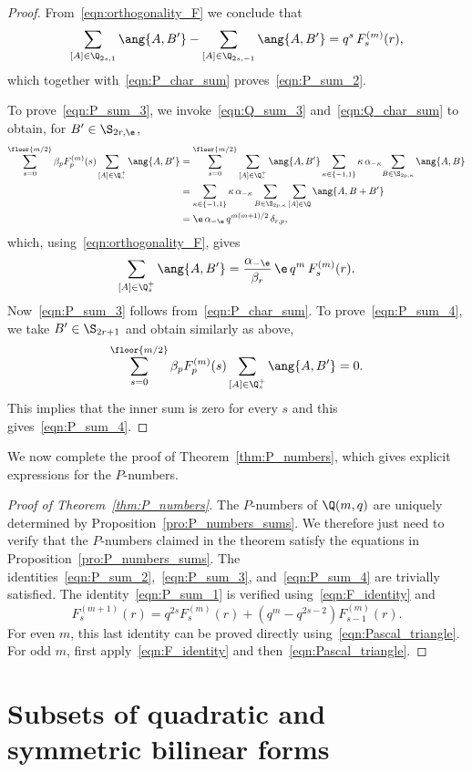 \begin{proof}
From~\eqref{eqn:orthogonality_F} we conclude that
\[
\sum_{[A]\in\Q_{2s,1}}\ang{A,B'}-\sum_{[A]\in\Q_{2s,-1}}\ang{A,B'}=q^s\,F^{(m)}_s(r),
\]
which together with~\eqref{eqn:P_char_sum} proves~\eqref{eqn:P_sum_2}.
\par
To prove~\eqref{eqn:P_sum_3}, we invoke~\eqref{eqn:Q_sum_3} and~\eqref{eqn:Q_char_sum} to obtain, for $B'\in\S_{2r,\e}$,
\begin{align*}
\sum_{s=0}^{\floor{m/2}}\beta_pF^{(m)}_p(s)\sum_{[A]\in\Q_s^+}\ang{A,B'}&=\sum_{s=0}^{\floor{m/2}}\sum_{[A]\in\Q_s^+}\ang{A,B'}\sum_{\kappa\in\{-1,1\}}\kappa\,\alpha_{-\kappa}\!\sum_{B\in\S_{2p,\kappa}}\ang{A,B}\\%
&=\sum_{\kappa\in\{-1,1\}}\kappa\,\alpha_{-\kappa}\sum_{B\in\S_{2p,\kappa}}\sum_{[A]\in\Q}\ang{A,B+B'}\\%
&=\e\,\alpha_{-\e}\,q^{m(m+1)/2}\,\delta_{r,p},
\end{align*}
which, using~\eqref{eqn:orthogonality_F}, gives
\[
\sum_{[A]\in\Q_s^+}\ang{A,B'}=\frac{\alpha_{-\e}}{\beta_r}\,\e\,q^m\,F^{(m)}_s(r).
\]
Now~\eqref{eqn:P_sum_3} follows from~\eqref{eqn:P_char_sum}. 
To prove~\eqref{eqn:P_sum_4}, we take $B'\in\S_{2r+1}$ and obtain similarly as above,
\[
\sum_{s=0}^{\floor{m/2}}\beta_pF^{(m)}_p(s)\sum_{[A]\in\Q_s^+}\ang{A,B'}=0.
\]
This implies that the inner sum is zero for every $s$ and this gives~\eqref{eqn:P_sum_4}.
\end{proof}
\par
We now complete the proof of Theorem~\ref{thm:P_numbers}, which gives explicit expressions for the $P$-numbers.
\begin{proof}[Proof of Theorem~\ref{thm:P_numbers}]
The $P$-numbers of $\Q(m,q)$ are uniquely determined by Proposition~\ref{pro:P_numbers_sums}. We therefore just need to verify that the $P$-numbers claimed in the theorem satisfy the equations in Proposition~\ref{pro:P_numbers_sums}. The identities~\eqref{eqn:P_sum_2},~\eqref{eqn:P_sum_3}, and~\eqref{eqn:P_sum_4} are trivially satisfied. The identity~\eqref{eqn:P_sum_1} is verified using~\eqref{eqn:F_identity} and
\[
%
F^{(m+1)}_s(r)=q^{2s}F^{(m)}_s(r)+(q^m-q^{2s-2})F^{(m)}_{s-1}(r).
\]
For even $m$, this last identity can be proved directly using~\eqref{eqn:Pascal_triangle}. For odd $m$, first apply~\eqref{eqn:F_identity} and then~\eqref{eqn:Pascal_triangle}.
\end{proof}

%

\section{Subsets of quadratic and symmetric bilinear forms}


